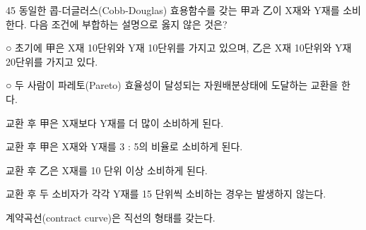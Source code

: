 \begin{question}{45}
동일한 콥-더글러스(Cobb-Douglas) 효용함수를 갖는 甲과 乙이 X재와 Y재를 소비한다. 다음 조건에 부합하는 설명으로 옳지 않은 것은?
\begin{framedtext}
○ 초기에 甲은 X재 10단위와 Y재 10단위를 가지고 있으며, 乙은 X재 10단위와 Y재 20단위를 가지고 있다. \par
○ 두 사람이 파레토(Pareto) 효율성이 달성되는 자원배분상태에 도달하는 교환을 한다.
\end{framedtext}
\begin{choices}
  \item 교환 후 甲은 X재보다 Y재를 더 많이 소비하게 된다.
  \item 교환 후 甲은 X재와 Y재를 3 : 5의 비율로 소비하게 된다.
  \item 교환 후 乙은 X재를 10 단위 이상 소비하게 된다.
  \item 교환 후 두 소비자가 각각 Y재를 15 단위씩 소비하는 경우는 발생하지 않는다.
  \item 계약곡선(contract curve)은 직선의 형태를 갖는다.
\end{choices}
\end{question}
